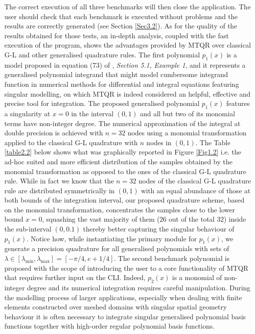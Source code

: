 \documentclass[a4paper, twosided]{book}
\begin{document}
\noindent
The correct execution of all three benchmarks will then close the application. The user should check that each benchmark is executed without problems and the results are correctly generated (see Section \ref{Sec3.2}). As for the quality of the results obtained for those tests, an in-depth analysis, coupled with the fast execution of the program, shows the advantages provided by MTQR over classical G-L and other generalised quadrature rules. The first polynomial $p_1(x)$ is a model proposed in equation (73) of \cite{Lombardi09}, \textsl{Section 5.1, Example 1}, and it represents a generalised polynomial integrand that might model cumbersome integrand function in numerical methods for differential and integral equations featuring singular modelling, on which MTQR is indeed considered an helpful, effective and precise tool for integration. The proposed generalised polynomial $p_1(x)$ features a singularity at $x=0$ in the interval $(0,1)$ and all but two of its monomial terms have non-integer degree. The numerical approximation of the integral at double precision is achieved with $n=32$ nodes using a monomial transformation applied to the classical G-L quadrature with $n$ nodes in $(0,1)$. The Table \ref{table2.2} below shows what was graphically reported in Figure \ref{Fig1.2} i.e. the ad-hoc suited and more efficient distribution of the samples obtained by the monomial transformation as opposed to the ones of the classical G-L quadrature rule. While in fact we know that the $n=32$ nodes of the classical G-L quadrature rule are distributed symmetrically in $(0,1)$ with an equal abundance of those at both bounds of the integration interval, our proposed quadrature scheme, based on the monomial transformation, concentrates the samples close to the lower bound $x=0$, squashing the vast majority of them ($26$ out of the total $32$) inside the sub-interval $(0,0.1)$ thereby better capturing the singular behaviour of $p_1(x)$. Notice how, while instantiating the primary module for $p_1(x)$, we generate a precision quadrature for all generalised polynomials with sets of $\lambda \in [\lambda_{\text{min}},\lambda_{\text{max}}]=[-\pi/4,e+1/4]$. The second benchmark polynomial is proposed with the scope of introducing the user to a core functionality of MTQR that requires further input on the CLI. Indeed, $p_2(x)$ is a monomial of non-integer degree and its numerical integration requires careful manipulation. During the modelling process of larger applications, especially when dealing with finite elements constructed over meshed domains with singular spatial geometry behaviour \cite{Graglia04,Graglia08} it is often necessary to integrate singular generalised polynomial basis functions together with high-order regular polynomial basis functions. 
\end{document}
